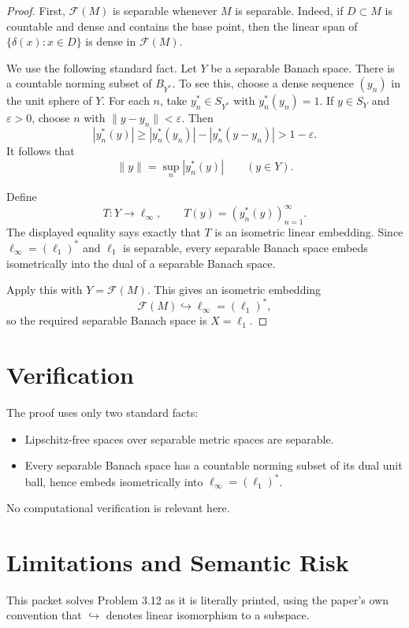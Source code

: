 \documentclass[11pt]{article}
\newcommand{\F}{\mathcal F}
\begin{document}
\begin{proof}
First, \(\F(M)\) is separable whenever \(M\) is separable. Indeed, if
\(D\subset M\) is countable and dense and contains the base point, then the
linear span of \(\{\delta(x):x\in D\}\) is dense in \(\F(M)\).

We use the following standard fact. Let \(Y\) be a separable Banach space. There
is a countable norming subset of \(B_{Y^*}\). To see this, choose a dense
sequence \((y_n)\) in the unit sphere of \(Y\). For each \(n\), take
\(y_n^*\in S_{Y^*}\) with \(y_n^*(y_n)=1\). If \(y\in S_Y\) and
\(\varepsilon>0\), choose \(n\) with \(\|y-y_n\|<\varepsilon\). Then
\[
  |y_n^*(y)|\ge |y_n^*(y_n)|-|y_n^*(y-y_n)|>1-\varepsilon.
\]
It follows that
\[
  \|y\|=\sup_n |y_n^*(y)|\qquad (y\in Y).
\]

Define
\[
  T:Y\longrightarrow \ell_\infty,\qquad
  T(y)=(y_n^*(y))_{n=1}^\infty .
\]
The displayed equality says exactly that \(T\) is an isometric linear
embedding. Since \(\ell_\infty=(\ell_1)^*\) and \(\ell_1\) is separable, every
separable Banach space embeds isometrically into the dual of a separable
Banach space.

Apply this with \(Y=\F(M)\). This gives an isometric embedding
\[
  \F(M)\hookrightarrow \ell_\infty=(\ell_1)^*,
\]
so the required separable Banach space is \(X=\ell_1\).
\end{proof}

\section*{Verification}

The proof uses only two standard facts:

\begin{itemize}
\item Lipschitz-free spaces over separable metric spaces are separable.
\item Every separable Banach space has a countable norming subset of its dual
  unit ball, hence embeds isometrically into \(\ell_\infty=(\ell_1)^*\).
\end{itemize}

No computational verification is relevant here.

\section*{Limitations and Semantic Risk}

This packet solves Problem 3.12 as it is literally printed, using the paper's
own convention that \(\hookrightarrow\) denotes linear isomorphism to a
subspace.
\end{document}
